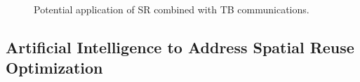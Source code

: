 \documentclass[comsoc]{IEEEtran}
\begin{document}
	\begin{figure}[ht!]
		\centering		
		\caption{Potential application of SR combined with TB communications.}		\label{fig:sr_and_tb}
	\end{figure}
	
	\subsection{Artificial Intelligence to Address Spatial Reuse Optimization}
	
\end{document}

